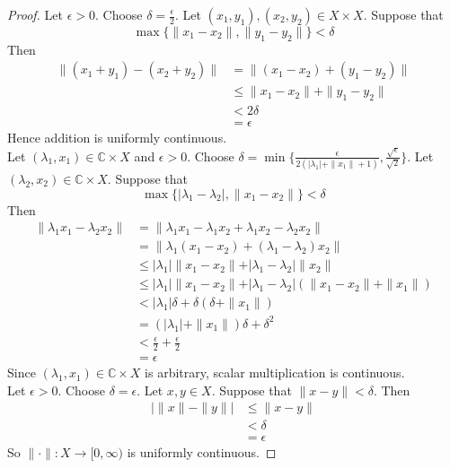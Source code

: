\documentclass[12pt]{amsart}
\theoremstyle{definition}
\newcommand{\del}{\delta}
\newcommand{\lam}{\lambda}
\newcommand{\ep}{\epsilon}
\newcommand{\C}{\mathbb{C}}
\newcommand{\Rg}{[0,\infty)}
\begin{document}
	\begin{proof}
		Let $\ep > 0$. Choose $\del = \frac{\ep}{2}$. Let $(x_1,y_1), (x_2,y_2) \in X \times X$. Suppose that 
		$$\max\{\|x_1-x_2 \|, \|y_1 - y_2 \|\} < \del$$
		Then 
		\begin{align*}
			\|(x_1 + y_1) - (x_2+y_2) \|
			&= \|(x_1-x_2) + (y_1-y_2) \|\\
			& \leq \| x_1-x_2 \|+ \|y_1-y_2 \|\\
			& < 2\del \\
			&= \ep
		\end{align*} 
		Hence addition is uniformly continuous. \vspace{1cm}\\ Let $(\lam_1,x_1) \in \C \times X$ and $\ep >0$. Choose $\del = \min\{\frac{\ep}{2(\vert \lam_1 \vert + \|x_1 \|+ 1)}, \frac{\sqrt{\ep}}{\sqrt{2}}\}$. Let $(\lam_2, x_2) \in \C \times X$. Suppose that $$ \max\{\vert \lam_1-\lam_2 \vert , \|x_1 - x_2 \|\} < \del$$ 
		Then 
		\begin{align*}
			\|\lam_1x_1 - \lam_2x_2 \|
			&= \|\lam_1x_1 - \lam_1x_2 + \lam_1x_2- \lam_2x_2 \|\\
			&= \|\lam_1(x_1-x_2) + (\lam_1-\lam_2)x_2 \|\\
			& \leq \vert \lam_1 \vert \| x_1-x_2 \|+ \vert \lam_1-\lam_2 \vert \|x_2\|\\
			& \leq \vert \lam_1 \vert  \| x_1-x_2 \|+ \vert \lam_1-\lam_2 \vert (\|x_1 -x_2\|+ \|x_1\|)\\
			& < \vert \lam_1 \vert \del  +  \del( \del + \|x_1 \|)\\
			&= (\vert \lam_1 \vert + \|x_1 \|) \del + \del^2 \\
			&< \frac{\ep}{2}+ \frac{\ep}{2}\\
			&= \ep
		\end{align*}
		Since $(\lam_1, x_1) \in \C \times X$ is arbitrary, scalar multiplication is continuous. \vspace{1cm} \\ Let $\ep > 0$. Choose $\del = \ep$. Let $x,y \in X$. Suppose that $\|x-y \|< \del$. Then 
		\begin{align*}
			\big \vert \|x \|- \|y \|\big  \vert
			& \leq \|x - y \|\\
			&< \del\\
			&=\ep
		\end{align*}  
		So $\|\cdot \|: X \rightarrow \Rg$ is uniformly continuous.
	\end{proof}
	
	
	
\end{document}
